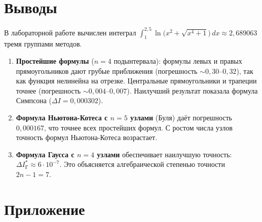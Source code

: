 \documentclass[a4paper, final]{article}
\begin{document}
\newpage

\section{Выводы}

В лабораторной работе вычислен интеграл
$\displaystyle\int_1^{2{,}5}\ln\!\bigl(x^2+\sqrt{x^4+1}\bigr)\,dx \approx 2{,}689063$
тремя группами методов.

\begin{enumerate}
\item \textbf{Простейшие формулы} ($n=4$ подынтервала): формулы левых и правых
прямоугольников дают грубые приближения (погрешность $\sim 0{,}30$--$0{,}32$),
так как функция нелинейна на отрезке. Центральные прямоугольники и трапеции
точнее (погрешность $\sim 0{,}004$--$0{,}007$). Наилучший результат показала
формула Симпсона ($\Delta I = 0{,}000302$).

\item \textbf{Формула Ньютона-Котеса с $n=5$ узлами} (Буля) даёт погрешность
$0{,}000167$, что точнее всех простейших формул. С ростом числа узлов точность
формул Ньютона-Котеса возрастает.

\item \textbf{Формула Гаусса с $n=4$ узлами} обеспечивает наилучшую точность:
$\Delta I^*_\text{Г} \approx 6\cdot10^{-7}$. Это объясняется алгебраической
степенью точности $2n-1=7$.
\end{enumerate}

\newpage

\section*{Приложение}
\end{document}

